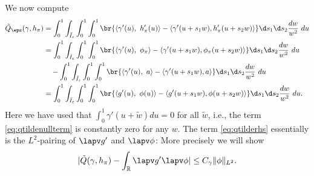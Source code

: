 We now compute
\begin{align}
 \tilde{Q}_\eps(\gamma,h_\pi) &=\int_{0}^{1}\int_{\tilde I_\varepsilon} \int_0^1 \int_0^1
  \br{\left\langle \gamma'(u),\ h_\pi'(u)\right\rangle - \left\langle \gamma'(u+s_1w), h'_\pi(u+s_2w)
  \right\rangle} \d s_1\d s_2\frac{dw}{w^2}\ du \nonumber  \\
 &= \int_{0}^{1}\int_{\tilde I_\varepsilon} \int_0^1 \int_0^1
  \br{\left\langle \gamma'(u),\ \phi_{\pi} \right\rangle - \left\langle \gamma'(u+s_1w),  \phi_\pi(u+s_2w)
  \right\rangle} \d s_1\d s_2\frac{dw}{w^2}\ du \nonumber \\
&\quad - \int_{0}^{1}\int_{\tilde I_\varepsilon} \int_0^1 \int_0^1
  \br{\left\langle \gamma'(u),\ a \right\rangle -\left\langle \gamma'(u+s_1w), a
  \right\rangle} \d s_1\d s_2\frac{dw}{w^2}\ du \label{eq:qtildenullterm} \\
&= \int_{0}^{1}\int_{\tilde I_\varepsilon} \int_0^1 \int_0^1
  \br{\left\langle g'(u),\ \phi(u) \right\rangle - \left\langle g'(u+s_1w), \phi(u+s_2w)
  \right\rangle} \d s_1\d s_2\frac{dw}{w^2}\ du . \label{eq:qtilderhs}
\end{align}
Here we have used that $\int_0^1 \gamma'(u+\tilde w) du =0$ for all $\tilde{w}$, i.e., the term \eqref{eq:qtildenullterm} is constantly zero for any $w$. The term \eqref{eq:qtilderhs} essentially is the $L^2$-pairing of $\lapv g'$ and $\lapv \phi$: More precisely we will show
\begin{equation} \label{eq:toRQ}
 |\tilde{Q}(\gamma,h_\pi) - \int_{\mathbb R} \lapv g' \lapv \phi | \leq C_\gamma \|\phi\|_{L^2}.
\end{equation}
